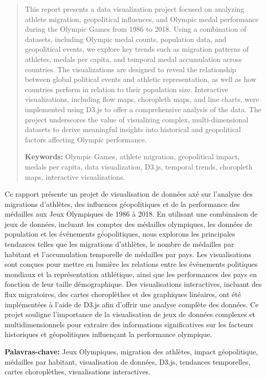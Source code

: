 \begin{abstract}

    This report presents a data visualization project focused on analyzing athlete migration, geopolitical influences, and Olympic medal performance during the Olympic Games from 1986 to 2018. Using a combination of datasets, including Olympic medal counts, population data, and geopolitical events, we explore key trends such as migration patterns of athletes, medals per capita, and temporal medal accumulation across countries. The visualizations are designed to reveal the relationship between global political events and athletic representation, as well as how countries perform in relation to their population size. Interactive visualizations, including flow maps, choropleth maps, and line charts, were implemented using D3.js to offer a comprehensive analysis of the data. The project underscores the value of visualizing complex, multi-dimensional datasets to derive meaningful insights into historical and geopolitical factors affecting Olympic performance.

    \vspace{1\baselineskip}

    \textbf{Keywords:} Olympic Games, athlete migration, geopolitical impact, medals per capita, data visualization, D3.js, temporal trends, choropleth maps, interactive visualizations.

\end{abstract}


\begin{secondAbstract}

    Ce rapport présente un projet de visualisation de données axé sur l'analyse des migrations d'athlètes, des influences géopolitiques et de la performance des médailles aux Jeux Olympiques de 1986 à 2018. En utilisant une combinaison de jeux de données, incluant les comptes des médailles olympiques, les données de population et les événements géopolitiques, nous explorons les principales tendances telles que les migrations d'athlètes, le nombre de médailles par habitant et l'accumulation temporelle de médailles par pays. Les visualisations sont conçues pour mettre en lumière les relations entre les événements politiques mondiaux et la représentation athlétique, ainsi que les performances des pays en fonction de leur taille démographique. Des visualisations interactives, incluant des flux migratoires, des cartes choroplèthes et des graphiques linéaires, ont été implémentées à l'aide de D3.js afin d'offrir une analyse complète des données. Ce projet souligne l'importance de la visualisation de jeux de données complexes et multidimensionnels pour extraire des informations significatives sur les facteurs historiques et géopolitiques influençant la performance olympique.

    \vspace{1\baselineskip}

    \textbf{Palavras-chave:} Jeux Olympiques, migration des athlètes, impact géopolitique, médailles par habitant, visualisation de données, D3.js, tendances temporelles, cartes choroplèthes, visualisations interactives.

\end{secondAbstract}



